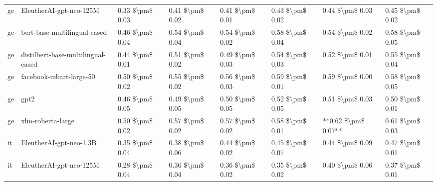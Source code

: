 \begin{tabular}{llllllll}
      ge &            EleutherAI-gpt-neo-125M & 0.33 \$\textbackslash pm\$ 0.03 &           0.41 \$\textbackslash pm\$ 0.02 &       0.41 \$\textbackslash pm\$ 0.01 &        0.43 \$\textbackslash pm\$ 0.02 &                         0.44 \$\textbackslash pm\$ 0.03 &     0.45 \$\textbackslash pm\$ 0.02 \\
      ge &       bert-base-multilingual-cased & 0.46 \$\textbackslash pm\$ 0.04 &           0.54 \$\textbackslash pm\$ 0.04 &       0.54 \$\textbackslash pm\$ 0.02 &        0.58 \$\textbackslash pm\$ 0.04 &                         0.54 \$\textbackslash pm\$ 0.02 &     0.58 \$\textbackslash pm\$ 0.05 \\
      ge & distilbert-base-multilingual-cased & 0.44 \$\textbackslash pm\$ 0.01 &           0.51 \$\textbackslash pm\$ 0.02 &       0.49 \$\textbackslash pm\$ 0.03 &        0.54 \$\textbackslash pm\$ 0.03 &                         0.52 \$\textbackslash pm\$ 0.01 &     0.55 \$\textbackslash pm\$ 0.04 \\
      ge &            facebook-mbart-large-50 & 0.50 \$\textbackslash pm\$ 0.02 &           0.55 \$\textbackslash pm\$ 0.02 &       0.56 \$\textbackslash pm\$ 0.03 &        0.59 \$\textbackslash pm\$ 0.01 &                         0.59 \$\textbackslash pm\$ 0.00 &     0.58 \$\textbackslash pm\$ 0.05 \\
      ge &                               gpt2 & 0.46 \$\textbackslash pm\$ 0.05 &           0.49 \$\textbackslash pm\$ 0.05 &       0.50 \$\textbackslash pm\$ 0.05 &        0.52 \$\textbackslash pm\$ 0.05 &                         0.51 \$\textbackslash pm\$ 0.03 &     0.50 \$\textbackslash pm\$ 0.01 \\
      ge &                  xlm-roberta-large & 0.50 \$\textbackslash pm\$ 0.02 &           0.57 \$\textbackslash pm\$ 0.02 &       0.57 \$\textbackslash pm\$ 0.02 &        0.58 \$\textbackslash pm\$ 0.01 &                     **0.62 \$\textbackslash pm\$ 0.07** &     0.61 \$\textbackslash pm\$ 0.03 \\
      it &            EleutherAI-gpt-neo-1.3B & 0.35 \$\textbackslash pm\$ 0.04 &           0.38 \$\textbackslash pm\$ 0.06 &       0.44 \$\textbackslash pm\$ 0.02 &        0.45 \$\textbackslash pm\$ 0.07 &                         0.44 \$\textbackslash pm\$ 0.09 &     0.47 \$\textbackslash pm\$ 0.01 \\
      it &            EleutherAI-gpt-neo-125M & 0.28 \$\textbackslash pm\$ 0.04 &           0.36 \$\textbackslash pm\$ 0.04 &       0.36 \$\textbackslash pm\$ 0.02 &        0.35 \$\textbackslash pm\$ 0.02 &                         0.40 \$\textbackslash pm\$ 0.06 &     0.37 \$\textbackslash pm\$ 0.01 \\

\end{tabular}
